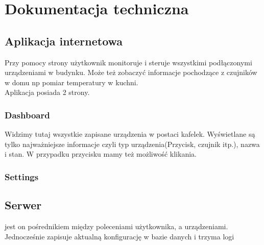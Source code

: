 \chapter{Dokumentacja techniczna}%
\section{Aplikacja internetowa}
Przy pomocy strony użytkownik monitoruje i steruje wszystkimi podłączonymi urządzeniami w budynku. Może też zobaczyć informacje pochodzące z czujników w domu np pomiar temperatury w kuchni. \\
Aplikacja posiada 2 strony.
\subsection{Dashboard}
Widzimy tutaj wszystkie zapisane urządzenia w postaci kafelek. Wyświetlane są tylko najważniejsze informacje czyli typ urządzenia(Przycisk, czujnik itp.), nazwa i stan. W przypadku przycisku mamy też możliwość klikania. 
\subsection{Settings}
\section{Serwer}
jest on pośrednikiem między poleceniami użytkownika, a urządzeniami. Jednocześnie zapisuje aktualną konfigurację w bazie danych i trzyma logi